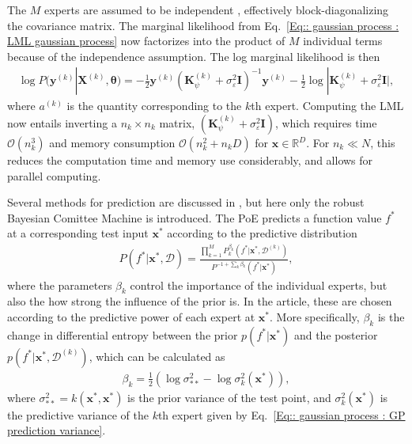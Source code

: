 \documentclass[twoside,english]{uiofysmaster}
\begin{document}
The $M$ experts are assumed to be independent \cite{deisenroth2015distributed}, effectively block-diagonalizing the covariance matrix. The marginal likelihood from Eq.~\ref{Eq:: gaussian process : LML gaussian process} now factorizes into the product of $M$ individual terms because of the independence assumption. The log marginal likelihood is then
\begin{align}
\log P(\textbf{y}^{(k)}|\textbf{X}^{(k)}, \boldsymbol{\theta}) = - \frac{1}{2} \textbf{y}^{(k)} (\textbf{K}_{\psi}^{(k)} + \sigma_{\varepsilon}^2 \textbf{I})^{-1}\textbf{y}^{(k)} - \frac{1}{2} \log
 |\textbf{K}_{\psi}^{(k)} + \sigma_{\varepsilon}^2 \textbf{I} |,
\end{align}
where $a^{(k)}$ is the quantity corresponding to the $k$th expert. Computing the LML now entails inverting a $n_k \times n_k$ matrix, $(\textbf{K}_{\psi}^{(k)} + \sigma_{\varepsilon}^2 \textbf{I})$, which requires time $\mathcal{O}(n_k^3)$ and memory consumption $\mathcal{O}(n_k^2 + n_kD)$ for $\textbf{x} \in \mathbb{R}^D$. For $n_k \ll N$, this reduces the computation time and memory use considerably, and allows for parallel computing. 

Several methods for prediction are discussed in \cite{deisenroth2015distributed}, but here only the robust Bayesian Comittee Machine is introduced. The PoE predicts a function value $f^*$ at a corresponding test input $\textbf{x}^*$ according to the predictive distribution
\begin{align}
P(f^* | \textbf{x}^*, \mathcal{D}) = \frac{\prod_{k=1}^M P_k^{\beta_k} (f^*| \textbf{x}^*, \mathcal{D}^{(k)})}{P^{-1 + \sum_k \beta_k} (f^* | \textbf{x}^*)},
\end{align}
where the parameters $\beta_k$ control the importance of the individual experts, but also the how strong the influence of the prior is. In the article, these are chosen according to the predictive power of each expert at $\textbf{x}^*$. More specifically, $\beta_k$ is the change in differential entropy between the prior $p(f^* | \textbf{x}^*)$ and the posterior $p(f^* | \textbf{x}^*, \mathcal{D}^{(k)})$, which can be calculated as 
\begin{align}
\beta_k = \frac{1}{2} (\log \sigma_{**}^2 - \log \sigma^2_k(\textbf{x}^*) ),
\end{align}
where $\sigma_{**}^2 = k(\textbf{x}^*, \textbf{x}^*)$ is the prior variance of the test point, and $\sigma_k^2 (\textbf{x}^*)$ is the predictive variance of the $k$th expert given by Eq.~\ref{Eq:: gaussian process : GP prediction variance}. 
\end{document}
